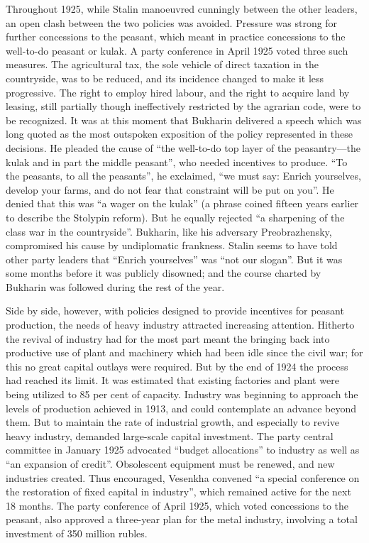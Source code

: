 Throughout 1925, while Stalin manoeuvred cunningly between the other leaders, an open clash between the two policies was avoided. Pressure was strong for further concessions to the peasant, which meant in practice concessions to the well-to-do peasant or kulak. A party conference in April 1925 voted three such measures. The agricultural tax, the sole vehicle of direct taxation in the countryside, was to be reduced, and its incidence changed to make it less progressive. The right to employ hired labour, and the right to acquire land by leasing, still partially though ineffectively restricted by the agrarian code, were to be recognized. It was at this moment that Bukharin delivered a speech which was long quoted as the most outspoken exposition of the policy represented in these decisions. He pleaded the cause of ``the well-to-do top layer of the peasantry---the kulak and in part the middle peasant'', who needed incentives to produce. ``To the peasants, to all the peasants'', he exclaimed, ``we must say: Enrich yourselves, develop your farms, and do not fear that constraint will be put on you''. He denied that this was ``a wager on the kulak'' (a phrase coined fifteen years earlier to describe the Stolypin reform). But he equally rejected ``a sharpening of the class war in the countryside''. Bukharin, like his adversary Preobrazhensky, compromised his cause by undiplomatic frankness. Stalin seems to have told other party leaders that ``Enrich yourselves'' was ``not our slogan''. But it was some months before it was publicly disowned; and the course charted by Bukharin was followed during the rest of the year. 

Side by side, however, with policies designed to provide incentives for peasant production, the needs of heavy industry attracted increasing attention. Hitherto the revival of industry had for the most part meant the bringing back into productive use of plant and machinery which had been idle since the civil war; for this no great capital outlays were required. But by the end of 1924 the process had reached its limit. It was estimated that existing factories and plant were being utilized to 85 per cent of capacity. Industry was beginning to approach the levels of production achieved in 1913, and could contemplate an advance beyond them. But to maintain the rate of industrial growth, and especially to revive heavy industry, demanded large-scale capital investment. The party central committee in January 1925 advocated ``budget allocations'' to industry as well as ``an expansion of credit''. Obsolescent equipment must be renewed, and new industries created. Thus encouraged, Vesenkha convened ``a special conference on the restoration of fixed capital in industry'', which remained active for the next 18 months. The party conference of April 1925, which voted concessions to the peasant, also approved a three-year plan for the metal industry, involving a total investment of 350 million rubles. 

